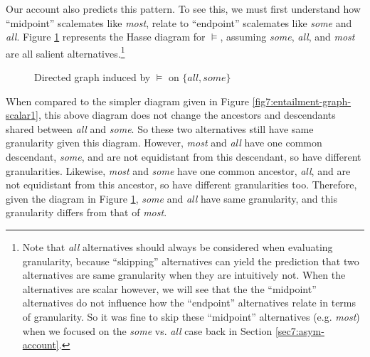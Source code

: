 Our account also predicts this pattern. To see this, we must first understand how ``midpoint'' scalemates like \textit{most}, relate to ``endpoint'' scalemates like \textit{some} and \textit{all}. Figure \ref{fig7:entailment-graph-scalar2} represents the Hasse diagram for $\vDash$, assuming \textit{some}, \textit{all}, and \textit{most} are all salient alternatives.\footnote{Note that \textit{all} alternatives should always be considered when evaluating granularity, because ``skipping'' alternatives can yield the prediction that two alternatives are same granularity when they are intuitively not. When the alternatives are scalar however, we will see that the the ``midpoint'' alternatives do not influence how the ``endpoint'' alternatives relate in terms of granularity. So it was fine to skip these ``midpoint'' alternatives (e.g. \textit{most}) when we focused on the \textit{some} vs. \textit{all} case back in Section \ref{sec7:asym-account}.}

\begin{figure}[H]
	\centering
	\caption[]{Directed graph induced by $\vDash$ on $\lbrace \textit{all}, \textit{some}\rbrace$}\label{fig7:entailment-graph-scalar2}
\end{figure}

When compared to the simpler diagram given in Figure \ref{fig7:entailment-graph-scalar1}, this above diagram does not change the ancestors and descendants shared between \textit{all} and \textit{some}. So these two alternatives still have same granularity given this diagram. However, \textit{most} and \textit{all} have one common descendant, \textit{some}, and are not equidistant from this descendant, so have different granularities. Likewise, \textit{most} and \textit{some} have one common ancestor, \textit{all}, and are not equidistant from this ancestor, so have different granularities too. Therefore, given the diagram in Figure \ref{fig7:entailment-graph-scalar2}, \textit{some} and \textit{all} have same granularity, and this granularity differs from that of \textit{most}.



